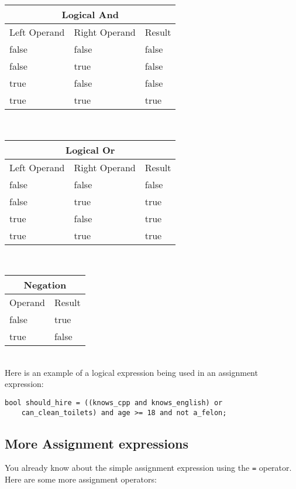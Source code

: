 \documentclass[a4paper,12pt]{article}
\begin{document}
\begin{tabular}{|l|l|l|}
\hline
\multicolumn{3}{|c|}{Logical And} \\
\hline
Left Operand & Right Operand & Result \\
\hline
false & false & false \\
\hline
false & true & false \\
\hline
true & false & false \\
\hline
true & true & true \\
\hline
\end{tabular} \\

\begin{tabular}{|l|l|l|}
\hline
\multicolumn{3}{|c|}{Logical Or} \\
\hline
Left Operand & Right Operand & Result \\
\hline
false & false & false \\
\hline
false & true & true \\
\hline
true & false & true \\
\hline
true & true & true \\
\hline
\end{tabular} \\

\begin{tabular}{|l|l|}
\hline
\multicolumn{2}{|c|}{Negation} \\
\hline
Operand & Result \\
\hline
false & true \\
\hline
true & false \\
\hline
\end{tabular} \\

Here is an example of a logical expression being used in an assignment expression:

\begin{lstlisting}
bool should_hire = ((knows_cpp and knows_english) or 
	can_clean_toilets) and age >= 18 and not a_felon;
\end{lstlisting}

\subsection*{More Assignment expressions}

You already know about the simple assignment expression using the \texttt{=} operator. Here are some more assignment operators:
\end{document}
